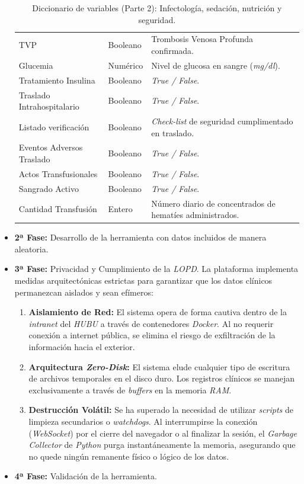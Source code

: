 \begin{itemize}
\begin{table}[hbt!]
{\begin{tabular}{lll}
TVP & Booleano & Trombosis Venosa Profunda confirmada. \\
Glucemia & Numérico & Nivel de glucosa en sangre (\textit{mg/dl}). \\
Tratamiento Insulina & Booleano & \textit{True / False}. \\
Traslado Intrahospitalario & Booleano & \textit{True / False}. \\
Listado verificación & Booleano & \textit{Check-list} de seguridad cumplimentado en traslado. \\
Eventos Adversos Traslado & Booleano & \textit{True / False}. \\
Actos Transfusionales & Booleano & \textit{True / False}. \\
Sangrado Activo & Booleano & \textit{True / False}. \\
Cantidad Transfusión & Entero & Número diario de concentrados de hematíes administrados. \\ \hline
\end{tabular}
}
\caption{Diccionario de variables (Parte 2): Infectología, sedación, nutrición y seguridad.}
\label{tab:variables_clinicas_2}
\end{table}

    \item \textbf{2ª Fase:} Desarrollo de la herramienta con datos incluidos de manera aleatoria.

    \item \textbf{3ª Fase:} Privacidad y Cumplimiento de la \textit{LOPD}. La plataforma implementa medidas arquitectónicas estrictas para garantizar que los datos clínicos permanezcan aislados y sean efímeros:
    \begin{enumerate}
        \item \textbf{Aislamiento de Red:} El sistema opera de forma cautiva dentro de la \textit{intranet} del \textit{HUBU} a través de contenedores \textit{Docker}. Al no requerir conexión a internet pública, se elimina el riesgo de exfiltración de la información hacia el exterior.
        \item \textbf{Arquitectura \textit{Zero-Disk}:} El sistema elude cualquier tipo de escritura de archivos temporales en el disco duro. Los registros clínicos se manejan exclusivamente a través de \textit{buffers} en la memoria \textit{RAM}.
        \item \textbf{Destrucción Volátil:} Se ha superado la necesidad de utilizar \textit{scripts} de limpieza secundarios o \textit{watchdogs}. Al interrumpirse la conexión (\textit{WebSocket}) por el cierre del navegador o al finalizar la sesión, el \textit{Garbage Collector} de \textit{Python} purga instantáneamente la memoria, asegurando que no quede ningún remanente físico o lógico de los datos.
    \end{enumerate}

    \item \textbf{4ª Fase:} Validación de la herramienta. 
\end{itemize}

